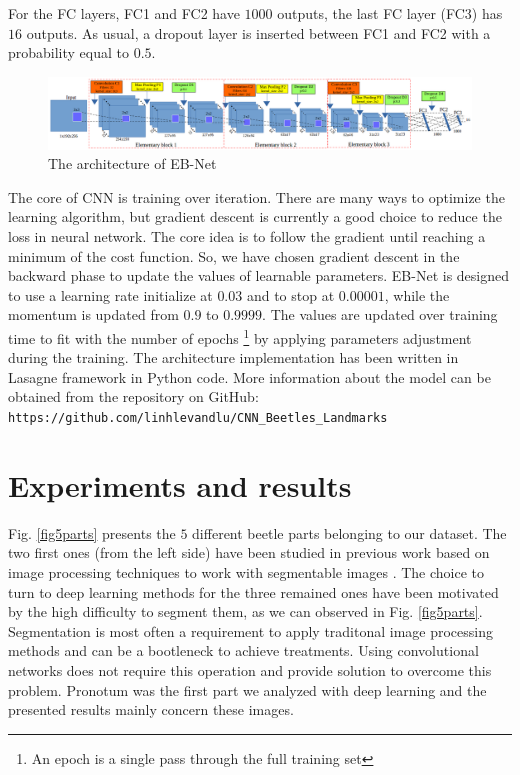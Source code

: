 \documentclass[review]{elsarticle}
\begin{document}
For the FC layers, FC1 and FC2 have $1000$ outputs, the last FC layer (FC3) has $16$ outputs. As usual, a dropout layer is inserted between FC1 and FC2 with a probability equal to $0.5$.

\begin{figure}[h]
	\centering
	\includegraphics[scale=0.3]{images/net3}
	\caption{The architecture of EB-Net}
	\label{fignet3}
\end{figure}

The core of CNN is training over iteration. There are many ways to
optimize the learning algorithm, but gradient descent
\cite{lecun2012efficient} is currently a good choice to reduce the
loss in neural network. The core idea is to follow the gradient until
reaching a minimum of the cost function. So, we have chosen gradient
descent in the backward phase to update the values of learnable
parameters. EB-Net is designed to use a learning rate initialize at
$0.03$ and to stop at $0.00001$, while the momentum is updated from
$0.9$ to $0.9999$. The values are updated over training time to fit
with the number of epochs \footnote{An epoch is a single pass through
  the full training set} by applying parameters adjustment during the
training. The architecture implementation has been written in Lasagne
framework \cite{lasagne} in Python code. More information about the
model can be obtained from the repository on GitHub:
\texttt{https://github.com/linhlevandlu/CNN\_Beetles\_Landmarks}

\section{Experiments and results}
\label{sexperiments}
Fig. \ref{fig5parts} presents the $5$ different beetle parts belonging
to our dataset. The two first ones (from the left side) have been
studied in previous work based on image processing techniques
to work with segmentable images \cite{le2017maelab}. The choice to
turn to deep learning methods for the three remained ones have
been motivated by the high difficulty to segment them, as we can
observed in Fig. \ref{fig5parts}. Segmentation is most often a
requirement to apply traditonal image processing methods and can be a
bootleneck to achieve treatments. Using convolutional networks does not
require this operation and provide solution to overcome this
problem. Pronotum was the first part we analyzed with deep learning and the presented results mainly concern
these images.
\end{document}
